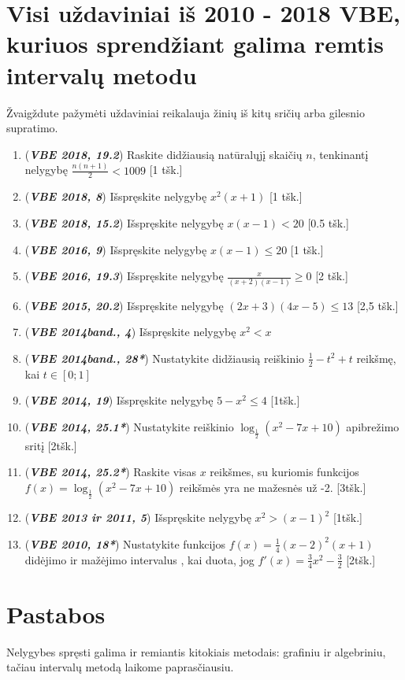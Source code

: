 \documentclass[a4paper,png]{article}
\begin{document}
\section*{Visi uždaviniai iš 2010 - 2018 VBE, kuriuos sprendžiant galima remtis intervalų metodu}
Žvaigždute pažymėti uždaviniai reikalauja žinių iš kitų sričių arba gilesnio supratimo.
\begin{enumerate}
\item (\textit{\textbf{VBE 2018, 19.2}}) Raskite didžiausią natūralųjį skaičių $n$, tenkinantį nelygybę $\frac{n(n+1)}{2}<1009$ [1 tšk.]
\item (\textit{\textbf{VBE 2018, 8}}) Išspręskite nelygybę $x^2(x+1)$ [1 tšk.]
\item (\textit{\textbf{VBE 2018, 15.2}}) Išspręskite nelygybę $x(x-1)<20$ [0.5 tšk.]
\item (\textit{\textbf{VBE 2016, 9}}) Išspręskite nelygybę $x(x-1)\le 20$ [1 tšk.]
\item (\textit{\textbf{VBE 2016, 19.3}}) Išspręskite nelygybę $\frac{x}{(x+2)(x-1)}\ge 0$ [2 tšk.]
\item (\textit{\textbf{VBE 2015, 20.2}}) Išspręskite nelygybę $(2x+3)(4x-5)\le 13$ [2,5 tšk.]
\item (\textit{\textbf{VBE 2014band., 4}}) Išspręskite nelygybę $x^2<x$
\item (\textit{\textbf{VBE 2014band., 28*}}) Nustatykite didžiausią reiškinio $\frac{1}{2}-t^2+t$ reikšmę, kai $t\in [0;1]$
\item (\textit{\textbf{VBE 2014, 19}}) Išspręskite nelygybę $5-x^2\le 4$ [1tšk.]
\item (\textit{\textbf{VBE 2014, 25.1*}}) Nustatykite reiškinio $\log_{\frac{1}{2}} (x^2-7x+10)$ apibrežimo sritį [2tšk.]
\item (\textit{\textbf{VBE 2014, 25.2*}}) Raskite visas $x$ reikšmes, su kuriomis funkcijos $f(x)=\log_{\frac{1}{2}} (x^2-7x+10)$ reikšmės yra ne mažesnės už -2. [3tšk.]
\item (\textit{\textbf{VBE 2013 ir 2011, 5}}) Išspręskite nelygybę $x^2>(x-1)^2$ [1tšk.]
\item (\textit{\textbf{VBE 2010, 18*}}) Nustatykite funkcijos $f(x)=\frac{1}{4}(x-2)^2(x+1)$ didėjimo ir mažėjimo intervalus , kai duota, jog $f'(x)=\frac{3}{4}x^2-\frac{3}{2}$ [2tšk.]
\end{enumerate}
\section*{Pastabos}
Nelygybes spręsti galima ir remiantis kitokiais metodais: grafiniu ir algebriniu, tačiau intervalų metodą laikome paprasčiausiu.
\end{document}
